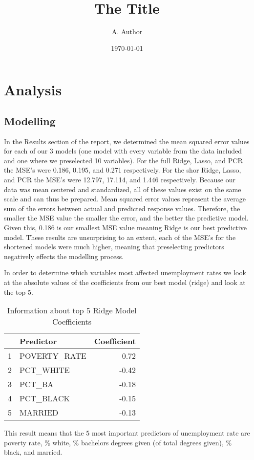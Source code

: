 \documentclass{article}
\begin{document}


\title{The Title}
\author{A. Author}
\date{\today}

\maketitle


\section{Analysis}

\subsection{Modelling}
In the Results section of the report, we determined the mean squared error values for each of our 3 models (one model with every variable from the data included and one where we preselected 10 variables).  For the full Ridge, Lasso, and PCR the MSE's were 0.186, 0.195, and 0.271 respectively. For the shor Ridge, Lasso, and PCR the MSE's were 12.797, 17.114, and 1.446 respectively. Because our data was mean centered and standardized, all of these values exist on the same scale and can thus be prepared.  Mean squared error values represent the average sum of the errors between actual and predicted response values. Therefore, the smaller the MSE value the smaller the error, and the better the predictive model.  Given this, 0.186 is our smallest MSE value meaning Ridge is our best predictive model. These results are unsurprising to an extent, each of the MSE's for the shortened models were much higher, meaning that preselecting predictors negatively effects the modelling process.  

In order to determine which variables most affected unemployment rates we look at the absolute values of the coefficients from our best model (ridge) and look at the top 5. 

\begin{table}[ht]
\centering
\begin{tabular}{rlr}
  \hline
 & Predictor & Coefficient \\ 
  \hline
1 & POVERTY\_RATE & 0.72 \\ 
  2 & PCT\_WHITE & -0.42 \\ 
  3 & PCT\_BA & -0.18 \\ 
  4 & PCT\_BLACK & -0.15 \\ 
  5 & MARRIED & -0.13 \\ 
   \hline
\end{tabular}
\caption{Information about top 5  Ridge Model Coefficients} 
\end{table}
This result means that the 5 most important predictors of unemployment rate are poverty rate, \% white, \% bachelors degrees given (of total degrees given), \% black, and married.  
\end{document}
